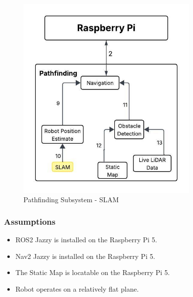 



\begin{figure}[h!]
	\centering
 	\includegraphics[width=0.80\textwidth]{images/pathfinding 2/Data_Flow_SLAM.jpeg}
 \caption{Pathfinding Subsystem - SLAM} %
\end{figure}

\subsubsection{Assumptions}
\begin{itemize}
    \item ROS2 Jazzy is installed on the Raspberry Pi 5.
    \item Nav2 Jazzy is installed on the Raspberry Pi 5.
    \item The Static Map is locatable on the Raspberry Pi 5.
    \item Robot operates on a relatively flat plane.
\end{itemize}
